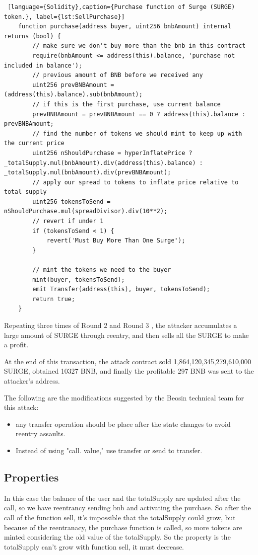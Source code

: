 \begin{lstlisting} [language={Solidity},caption={Purchase function of Surge (SURGE) token.}, label={lst:SellPurchase}]
    function purchase(address buyer, uint256 bnbAmount) internal returns (bool) {
        // make sure we don't buy more than the bnb in this contract
        require(bnbAmount <= address(this).balance, 'purchase not included in balance');
        // previous amount of BNB before we received any        
        uint256 prevBNBAmount = (address(this).balance).sub(bnbAmount);
        // if this is the first purchase, use current balance
        prevBNBAmount = prevBNBAmount == 0 ? address(this).balance : prevBNBAmount;
        // find the number of tokens we should mint to keep up with the current price
        uint256 nShouldPurchase = hyperInflatePrice ? _totalSupply.mul(bnbAmount).div(address(this).balance) : _totalSupply.mul(bnbAmount).div(prevBNBAmount);
        // apply our spread to tokens to inflate price relative to total supply
        uint256 tokensToSend = nShouldPurchase.mul(spreadDivisor).div(10**2);
        // revert if under 1
        if (tokensToSend < 1) {
            revert('Must Buy More Than One Surge');
        }
        
        // mint the tokens we need to the buyer
        mint(buyer, tokensToSend);
        emit Transfer(address(this), buyer, tokensToSend);
        return true;
    }
\end{lstlisting}

Repeating three times of Round 2 and Round 3 , the attacker accumulates a large amount of SURGE through reentry, and then sells all the SURGE to make a profit.

At the end of this transaction, the attack contract sold 1,864,120,345,279,610,000 SURGE, 
obtained 10327 BNB, and finally the profitable 297 BNB was sent to the attacker's address.

The following are the modifications suggested by the Beosin technical team for this attack:
\begin{itemize}
    \item any transfer operation should be place after the state changes to avoid reentry assaults.
    \item Instead of using "call. value," use transfer or send to transfer. 
\end{itemize}

\subsection{Properties}
In this case the balance of the user and the totalSupply are updated after the call, so we have reentrancy sending bnb and activating the purchase.
So after the call of the function sell, it's impossible that the totalSupply could grow, but because of the reentranacy, the purchase function is called, 
so more tokens are minted considering the old value of the totalSupply. So the property is the totalSupply can't grow with function sell, it must decrease.

